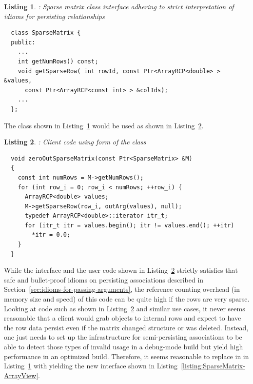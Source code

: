 \documentclass[pdf,ps2pdf,11pt]{SANDreport}
\newtheorem{listing}{Listing}
\begin{document}
\begin{listing}: Sparse matrix class interface adhering to strict
interpretation of idioms for persisting relationships  \\
\label{listing:SparseMatrix-ArrayRCP}
{\small\begin{verbatim}
  class SparseMatrix {
  public:
    ...
    int getNumRows() const;
    void getSparseRow( int rowId, const Ptr<ArrayRCP<double> > &values,
      const Ptr<ArrayRCP<const int> > &colIds);
    ...
  };
\end{verbatim}}
\end{listing}


The {} class shown in
Listing~\ref{listing:SparseMatrix-ArrayRCP} would be used as shown in
Listing~\ref{listing:zeroOutSparseMatrix-ArrayRCP}.


\begin{listing}: Client code using {} form of the
 {} class  \\
\label{listing:zeroOutSparseMatrix-ArrayRCP}
{\small\begin{verbatim}
  void zeroOutSparseMatrix(const Ptr<SparseMatrix> &M)
  {
    const int numRows = M->getNumRows();
    for (int row_i = 0; row_i < numRows; ++row_i) {
      ArrayRCP<double> values;
      M->getSparseRow(row_i, outArg(values), null);
      typedef ArrayRCP<double>::iterator itr_t;
      for (itr_t itr = values.begin(); itr != values.end(); ++itr)
        *itr = 0.0;
    }
  }
\end{verbatim}}
\end{listing}


While the interface and the user code shown in
Listing~\ref{listing:zeroOutSparseMatrix-ArrayRCP} strictly satisfies
that safe and bullet-proof idioms on persisting associations described
in Section~\ref{sec:idioms-for-passing-arguments}, the reference
counting overhead (in memory size and speed) of this code can be quite
high if the rows are very sparse.  Looking at code such as shown in
Listing~\ref{listing:zeroOutSparseMatrix-ArrayRCP} and similar use
cases, it never seems reasonable that a client would grab
{} objects to internal rows and expect to have the row
data persist even if the matrix changed structure or was deleted.
Instead, one just needs to set up the infrastructure for
semi-persisting associations to be able to detect those types of
invalid usage in a debug-mode build but yield high performance in an
optimized build.  Therefore, it seems reasonable to replace
{} in {} in
Listing~\ref{listing:SparseMatrix-ArrayRCP} with {}
yielding the new {} interface shown in
Listing~\ref{listing:SparseMatrix-ArrayView}.
\end{document}
